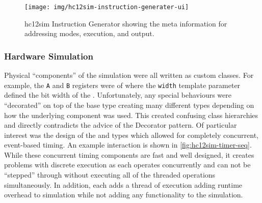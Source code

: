 \begin{figure}[h!t]
    \centering
    \texttt{[image: img/hc12sim-instruction-generater-ui]}
    \caption{hc12sim Instruction Generator showing the meta information for addressing modes, execution, and output.}
    \label{fig:hc12sim-instruction-generater-ui}
\end{figure}

\subsubsection*{Hardware Simulation}
\label{hc12sim:hardware-simulation}

Physical ``components'' of the simulation were all written as custom classes. For example, the \verb|A| and \verb|B| registers were of  where the \verb|width| template parameter defined the bit width of the . Unfortunately, any special behaviours were ``decorated'' on top of the base type creating many different types depending on how the underlying component was used. This created confusing class hierarchies and directly contradicts the advice of the Decorator pattern\cite[p.~175]{go4}. Of particular interest was the design of the  and  types which allowed for completely concurrent, event-based timing. An example interaction is shown in \cref{fig:hc12sim-timer-seq}. While these concurrent timing components are fast and well designed, it creates problems with discrete execution as each operates concurrently and can not be ``stepped'' through without executing all of the threaded operations simultaneously. In addition, each  adds a thread of execution adding runtime overhead to simulation while not adding any functionality to the simulation.

